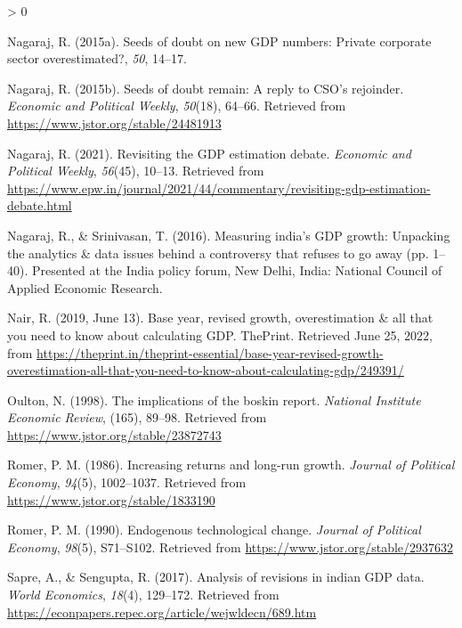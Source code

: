 \documentclass[12pt,nobind, a4paper]{reedthesis}
\newlength{\cslhangindent}
\newenvironment{CSLReferences}[2] %
{%
	\setlength{\parindent}{0pt}
	\ifodd #1 \everypar{\setlength{\hangindent}{\cslhangindent}}\ignorespaces\fi
	\ifnum #2 > 0
	\setlength{\parskip}{#2\baselineskip}
	\fi
}%
{}
\begin{document}
\begin{CSLReferences}{1}{0}
 \leavevmode\hypertarget{ref-nagaraj_seeds_2015-1}{}%
 Nagaraj, R. (2015a). Seeds of doubt on new {GDP} numbers: Private corporate sector overestimated?, \emph{50}, 14--17.

 \leavevmode\hypertarget{ref-nagaraj_seeds_2015}{}%
 Nagaraj, R. (2015b). Seeds of doubt remain: A reply to {CSO}'s rejoinder. \emph{Economic and Political Weekly}, \emph{50}(18), 64--66. Retrieved from \url{https://www.jstor.org/stable/24481913}

 \leavevmode\hypertarget{ref-nagaraj_revisiting_2021}{}%
 Nagaraj, R. (2021). Revisiting the {GDP} estimation debate. \emph{Economic and Political Weekly}, \emph{56}(45), 10--13. Retrieved from \url{https://www.epw.in/journal/2021/44/commentary/revisiting-gdp-estimation-debate.html}

 \leavevmode\hypertarget{ref-nagaraj_measuring_2016}{}%
 Nagaraj, R., \& Srinivasan, T. (2016). Measuring india's {GDP} growth: Unpacking the analytics \& data issues behind a controversy that refuses to go away (pp. 1--40). Presented at the India policy forum, New Delhi, India: National Council of Applied Economic Research.

 \leavevmode\hypertarget{ref-nair_base_2019}{}%
 Nair, R. (2019, June 13). Base year, revised growth, overestimation \& all that you need to know about calculating {GDP}. {ThePrint}. Retrieved June 25, 2022, from \url{https://theprint.in/theprint-essential/base-year-revised-growth-overestimation-all-that-you-need-to-know-about-calculating-gdp/249391/}

 \leavevmode\hypertarget{ref-oulton_implications_1998}{}%
 Oulton, N. (1998). The implications of the boskin report. \emph{National Institute Economic Review}, (165), 89--98. Retrieved from \url{https://www.jstor.org/stable/23872743}

 \leavevmode\hypertarget{ref-romer_increasing_1986}{}%
 Romer, P. M. (1986). Increasing returns and long-run growth. \emph{Journal of Political Economy}, \emph{94}(5), 1002--1037. Retrieved from \url{https://www.jstor.org/stable/1833190}

 \leavevmode\hypertarget{ref-romer_endogenous_1990}{}%
 Romer, P. M. (1990). Endogenous technological change. \emph{Journal of Political Economy}, \emph{98}(5), S71--S102. Retrieved from \url{https://www.jstor.org/stable/2937632}

 \leavevmode\hypertarget{ref-sapre_analysis_2017}{}%
 Sapre, A., \& Sengupta, R. (2017). Analysis of revisions in indian {GDP} data. \emph{World Economics}, \emph{18}(4), 129--172. Retrieved from \url{https://econpapers.repec.org/article/wejwldecn/689.htm}


\end{CSLReferences}
\end{document}
